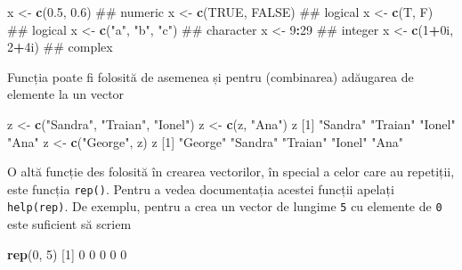 \documentclass[]{article}
\newenvironment{Shaded}{\begin{snugshade}}{\end{snugshade}}
\newcommand{\KeywordTok}[1]{\textcolor[rgb]{0.13,0.29,0.53}{\textbf{#1}}}
\newcommand{\DecValTok}[1]{\textcolor[rgb]{0.00,0.00,0.81}{#1}}
\newcommand{\FloatTok}[1]{\textcolor[rgb]{0.00,0.00,0.81}{#1}}
\newcommand{\StringTok}[1]{\textcolor[rgb]{0.31,0.60,0.02}{#1}}
\newcommand{\OtherTok}[1]{\textcolor[rgb]{0.56,0.35,0.01}{#1}}
\newcommand{\OperatorTok}[1]{\textcolor[rgb]{0.81,0.36,0.00}{\textbf{#1}}}
\newcommand{\NormalTok}[1]{#1}
\begin{document}
\begin{Shaded}
\begin{Highlighting}[]
\NormalTok{x <-}\StringTok{ }\KeywordTok{c}\NormalTok{(}\FloatTok{0.5}\NormalTok{, }\FloatTok{0.6}\NormalTok{)       ## numeric}
\NormalTok{x <-}\StringTok{ }\KeywordTok{c}\NormalTok{(}\OtherTok{TRUE}\NormalTok{, }\OtherTok{FALSE}\NormalTok{)    ## logical}
\NormalTok{x <-}\StringTok{ }\KeywordTok{c}\NormalTok{(T, F)           ## logical}
\NormalTok{x <-}\StringTok{ }\KeywordTok{c}\NormalTok{(}\StringTok{"a"}\NormalTok{, }\StringTok{"b"}\NormalTok{, }\StringTok{"c"}\NormalTok{)  ## character}
\NormalTok{x <-}\StringTok{ }\DecValTok{9}\OperatorTok{:}\DecValTok{29}\NormalTok{              ## integer}
\NormalTok{x <-}\StringTok{ }\KeywordTok{c}\NormalTok{(}\DecValTok{1}\OperatorTok{+}\NormalTok{0i, }\DecValTok{2}\OperatorTok{+}\NormalTok{4i)     ## complex}
\end{Highlighting}
\end{Shaded}

Funcția poate fi folosită de asemenea și pentru (combinarea) adăugarea
de elemente la un vector

\begin{Shaded}
\begin{Highlighting}[]
\NormalTok{z <-}\StringTok{ }\KeywordTok{c}\NormalTok{(}\StringTok{"Sandra"}\NormalTok{, }\StringTok{"Traian"}\NormalTok{, }\StringTok{"Ionel"}\NormalTok{)}
\NormalTok{z <-}\StringTok{ }\KeywordTok{c}\NormalTok{(z, }\StringTok{"Ana"}\NormalTok{)}
\NormalTok{z}
\NormalTok{[}\DecValTok{1}\NormalTok{] }\StringTok{"Sandra"} \StringTok{"Traian"} \StringTok{"Ionel"}  \StringTok{"Ana"}   
\NormalTok{z <-}\StringTok{ }\KeywordTok{c}\NormalTok{(}\StringTok{"George"}\NormalTok{, z)}
\NormalTok{z}
\NormalTok{[}\DecValTok{1}\NormalTok{] }\StringTok{"George"} \StringTok{"Sandra"} \StringTok{"Traian"} \StringTok{"Ionel"}  \StringTok{"Ana"}   
\end{Highlighting}
\end{Shaded}

O altă funcție des folosită în crearea vectorilor, în special a celor
care au repetiții, este funcția \texttt{rep()}. Pentru a vedea
documentația acestei funcții apelați \texttt{help(rep)}. De exemplu,
pentru a crea un vector de lungime \texttt{5} cu elemente de \texttt{0}
este suficient să scriem

\begin{Shaded}
\begin{Highlighting}[]
\KeywordTok{rep}\NormalTok{(}\DecValTok{0}\NormalTok{, }\DecValTok{5}\NormalTok{)}
\NormalTok{[}\DecValTok{1}\NormalTok{] }\DecValTok{0} \DecValTok{0} \DecValTok{0} \DecValTok{0} \DecValTok{0}
\end{Highlighting}
\end{Shaded}
\end{document}
